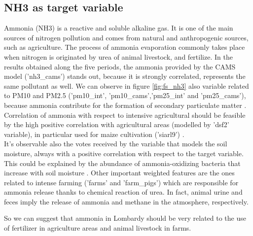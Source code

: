\subsection{NH3 as target variable}
Ammonia (NH3) is a reactive and soluble alkaline gas. It is one of the main sources of nitrogen pollution and comes from natural and anthropogenic sources, such as agriculture.
The process of ammonia evaporation commonly takes place when nitrogen is originated by urea of animal livestock, and fertilize. 
In the results obtained along the five periods, the ammonia provided by the CAMS model ('nh3\_cams') stands out, because it is strongly correlated, represents the same pollutant as well.
We can observe in figure \ref{fig:fs_nh3} also variable related to PM10 and PM2.5 ('pm10\_int', 'pm10\_cams','pm25\_int' and 'pm25\_cams'), because ammonia contribute for the formation of secondary particulate matter \cite{dai2019concentrations}\cite{zhu2015sources}.\\
Correlation of ammonia with respect to intensive agricultural should be feasible by the high positive correlation with agricultural areas (modelled by 'dsf2' variable), in particular used for maize cultivation ('siarl9') .\\
It's observable also the votes received by the variable that models the soil moisture, always with a positive correlation with respect to the target variable. This could be explained by the abundance of ammonia-oxidizing bacteria that increase with soil moisture \cite{avrahami2007response}.  
Other important weighted features are the ones related to intense farming ('farms' and 'farm\_pigs') which are responsible for ammonia release thanks to chemical reaction of urea.
In fact, animal urine and feces imply the release of ammonia and methane in the atmosphere, respectively\cite{saggar2004review}.

So we can suggest that ammonia in Lombardy should be very related to the use of fertilizer in agriculture areas and animal livestock in farms.
